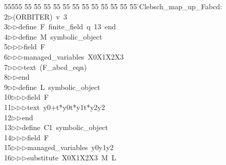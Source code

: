 %
%
\begin{tabbing}
55555 \= 55 \= 55 \= 55 \= 55 \= 55 \= 55 \= 55 \= 55 \= 55 \= 55 \= 55 \= 55 \= \>Clebsch\_map\_up\_Fabcd:\\[0pt]
2\>$\triangleright$\>(ORBITER)\ v\ 3\ \\[0pt]
3\>$\triangleright$\>$\triangleright$\>define\ F\ finite\_field\ q\ 13\ end\ \\[0pt]
4\>$\triangleright$\>$\triangleright$\>define\ M\ symbolic\_object\ \\[0pt]
5\>$\triangleright$\>$\triangleright$\>$\triangleright$\>field\ F\ \\[0pt]
6\>$\triangleright$\>$\triangleright$\>$\triangleright$\>managed\_variables\ X0X1X2X3\ \\[0pt]
7\>$\triangleright$\>$\triangleright$\>$\triangleright$\>text\ (F\_abcd\_eqn)\ \\[0pt]
8\>$\triangleright$\>$\triangleright$\>end\ \\[0pt]
9\>$\triangleright$\>$\triangleright$\>define\ L\ symbolic\_object\ \\[0pt]
10\>$\triangleright$\>$\triangleright$\>$\triangleright$\>field\ F\ \\[0pt]
11\>$\triangleright$\>$\triangleright$\>$\triangleright$\>text\ y0+t*y0t*y1t*y2y2\ \\[0pt]
12\>$\triangleright$\>$\triangleright$\>end\ \\[0pt]
13\>$\triangleright$\>$\triangleright$\>define\ C1\ symbolic\_object\ \\[0pt]
14\>$\triangleright$\>$\triangleright$\>$\triangleright$\>field\ F\ \\[0pt]
15\>$\triangleright$\>$\triangleright$\>$\triangleright$\>managed\_variables\ y0y1y2\ \\[0pt]
16\>$\triangleright$\>$\triangleright$\>$\triangleright$\>substitute\ X0X1X2X3\ M\ L\ \\[0pt]

\end{tabbing}
